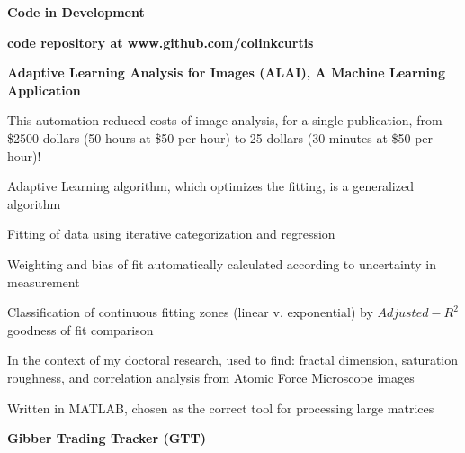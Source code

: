 \documentclass[letterpaper,final]{memoir}
\newcommand{\LargeSep}{\vspace{1.3em}}
\newcommand{\Sep}{\vspace{1.0em}}
\newcommand{\SmallSep}{\vspace{0.4em}}
\newcommand{\CVSection}[1]
	{\LARGE\textbf{#1}\par
	\SmallSep\normalsize}
\newcommand{\CVItem}[1]
	{\textbf{\color{Blue} #1}}
\begin{document}
\LargeSep


\notoserif \CVSection{Code in Development}

\normalfont

\Sep

\CVItem{code repository at www.github.com/colinkcurtis} 

\Sep

\CVItem{Adaptive Learning Analysis for Images (ALAI), A Machine Learning Application} 

\begin{compactitem}[\color{Blue}$\circ$]
   
    \SmallSep

    \item This automation reduced costs of image analysis, for a single publication, from \$2500 dollars (50 hours at \$50 per hour) to 25 dollars (30 minutes at \$50 per hour)!

    \item Adaptive Learning algorithm, which optimizes the fitting, is a generalized algorithm

    \item Fitting of data using iterative categorization and regression

    \item Weighting and bias of fit automatically calculated according to uncertainty in measurement

    \item Classification of continuous fitting zones (linear v. exponential) by $Adjusted-R^2$ goodness of fit comparison

    \item In the context of my doctoral research, used to find: fractal dimension, saturation roughness, and correlation analysis from Atomic Force Microscope images

    \item Written in MATLAB, chosen as the correct tool for processing large matrices
    

\end{compactitem}

\newpage

\CVItem{Gibber Trading Tracker (GTT)} 
\end{document}
